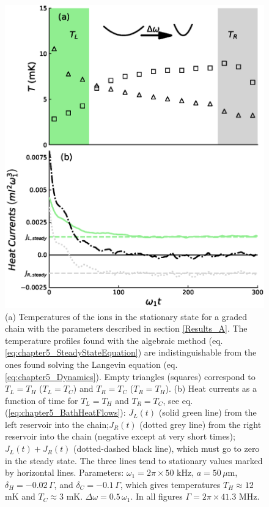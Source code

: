 \begin{figure}
  \center
  \includegraphics[width=0.75\linewidth]{Figures/24Mg_Temperature_Profiles_And_Evolution.eps}
  \caption{(a) Temperatures of the ions in the stationary state for a graded chain with the parameters described in section \ref{Results_A}. The temperature profiles found with the algebraic method (eq. \eqref{eq:chapter5_SteadyStateEquation}) are indistinguishable from the ones found solving the Langevin equation (eq. \eqref{eq:chapter5_Dynamics}). Empty triangles (squares) correspond to $T_L = T_H$ ($T_L = T_C$) and $T_R = T_C$ ($T_R = T_H$). (b) Heat currents  as a function of time for $T_L = T_H$ and $T_R = T_C$, see eq. (\ref{eq:chapter5_BathHeatFlows}): $J_L(t)$ (solid green line) from the left reservoir into the chain;$J_R(t)$ (dotted grey line) from the right reservoir into the chain (negative except at very short times); $J_L(t)+J_R(t)$ (dotted-dashed black line), which must go to zero in the steady state. The three lines tend to stationary values marked by horizontal lines. Parameters: $\omega_1 = 2\pi \times 50$ kHz, $a=50\, \mu$m,  $\delta_H = -0.02 \, \Gamma$, and $\delta_C = -0.1 \, \Gamma$, which gives temperatures $T_H \approx 12$ mK and $T_C \approx 3$ mK. $\Delta\omega = 0.5 \, \omega_1$. In all figures $\Gamma = 2\pi \times 41.3$ MHz.}
  \label{fig:Temperature_Profiles_Magnesium}
\end{figure}

